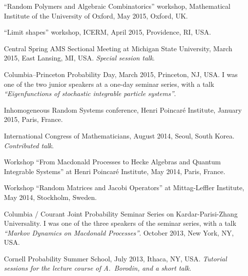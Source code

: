 \documentclass[letterpaper,11pt]{article}
\begin{document}
\begin{etaremune}
	\item
	      ``Random Polymers and Algebraic Combinatorics'' workshop,
	      Mathematical Institute of the University of Oxford, May 2015,
	      Oxford, UK.

	\item
	      ``Limit shapes'' workshop, ICERM, April 2015, Providence, RI,
	      USA.

	\item
	      Central Spring AMS Sectional Meeting at Michigan State
	      University, March
	      2015, East Lansing, MI, USA. \emph{Special session talk}.

	\item
	      Columbia--Princeton Probability Day, March 2015, Princeton, NJ,
	      USA.
	      I was one of the two junior speakers at a one-day seminar
	      series,
	      with a talk \emph{``Eigenfunctions of stochastic integrable
		      particle
		      systems''}.

	\item
	      Inhomogeneous Random Systems conference, Henri Poincar\'e
	      Institute,
	      January 2015, Paris, France.

	\item
	      International Congress of Mathematicians, August 2014,
	      Seoul, South Korea. \emph{Contributed talk}.

	\item
	      Workshop
	      ``From Macdonald Processes to Hecke Algebras and Quantum
	      Integrable Systems''
	      at Henri Poincar\'e Institute,
	      May 2014, Paris, France.

	\item
	      Workshop
	      ``Random Matrices and Jacobi Operators''
	      at
	      Mittag-Leffler Institute,
	      May 2014, Stockholm, Sweden.

	\item
	      Columbia / Courant Joint Probability Seminar Series on
	      Kardar-Parisi-Zhang
	      Universality.
	      I was one of the three speakers of the seminar series,
	      with a talk
	      \emph{``Markov Dynamics on Macdonald Processes''}.
	      October 2013, New York, NY, USA.

	\item
	      Cornell Probability Summer School, July 2013, Ithaca, NY, USA.
	      \emph{Tutorial sessions for the lecture course of
		      A.~Borodin, and a short talk}.


\end{etaremune}
\end{document}
